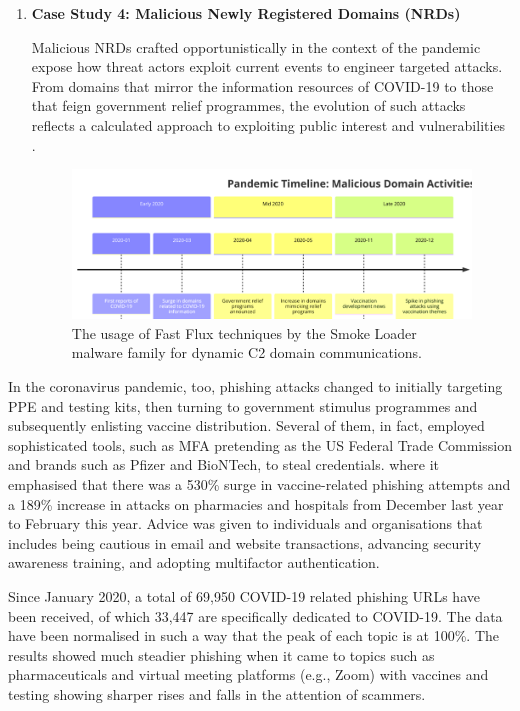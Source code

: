 \begin{enumerate}
\item\textbf{Case Study 4:  Malicious Newly Registered Domains (NRDs)}

Malicious NRDs crafted opportunistically in the context of the pandemic expose how threat actors exploit current events to engineer targeted attacks. \cite{paloaltonetworks2021dnsattacks} From domains that mirror the information resources of COVID-19 to those that feign government relief programmes, the evolution of such attacks reflects a calculated approach to exploiting public interest and vulnerabilities  \cite{unit42_covid19_phishing_2021} .

\captionsetup{font= footnotesize}
\begin{figure}[H]
    \centering
    \includegraphics[width=0.8\linewidth]{background/PandemicTime.png}
    \caption{The usage of Fast Flux techniques by the Smoke Loader malware family for dynamic C2 domain communications.}
    \label{fig:figThirteen}
\end{figure}

\end{enumerate}

In the coronavirus pandemic, too, phishing attacks changed to initially targeting PPE and testing kits, then turning to government stimulus programmes and subsequently enlisting vaccine distribution. Several of them, in fact, employed sophisticated tools, such as MFA pretending as the US Federal Trade Commission and brands such as Pfizer and BioNTech, to steal credentials. where it emphasised that there was a 530\% surge in vaccine-related phishing attempts and a 189\% increase in attacks on pharmacies and hospitals from December last year to February this year. Advice was given to individuals and organisations that includes being cautious in email and website transactions, advancing security awareness training, and adopting multifactor authentication.

Since January 2020, a total of 69,950 COVID-19 related phishing URLs have been received, of which 33,447 are specifically dedicated to COVID-19. The data have been normalised in such a way that the peak of each topic is at 100\%. The results showed much steadier phishing when it came to topics such as pharmaceuticals and virtual meeting platforms (e.g., Zoom) with vaccines and testing showing sharper rises and falls in the attention of scammers.

